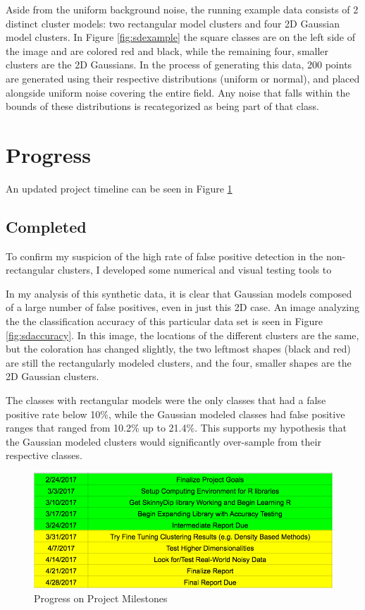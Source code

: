 \documentclass{sig-alternate-05-2015}
\begin{document}
Aside from the uniform background noise, the running example data consists of 2 distinct cluster models: two rectangular model clusters and four 2D Gaussian model clusters. In Figure \ref{fig:sdexample} the square classes are on the left side of the image and are colored red and black, while the remaining four, smaller clusters are the 2D Gaussians. In the process of generating this data, 200 points are generated using their respective distributions (uniform or normal), and placed alongside uniform noise covering the entire field. Any noise that falls within the bounds of these distributions is recategorized as being part of that class.

\section{Progress}
An updated project timeline can be seen in Figure \ref{fig:newmilestones}
\subsection{Completed}
To confirm my suspicion of the high rate of false positive detection in the non-rectangular clusters, I developed some numerical and visual testing tools to 

In my analysis of this synthetic data, it is clear that Gaussian models composed of a large number of false positives, even in just this 2D case. An image analyzing the the classification accuracy of this particular data set is seen in Figure \ref{fig:sdaccuracy}. In this image, the locations of the different clusters are the same, but the coloration has changed slightly, the two leftmost shapes (black and red) are still the rectangularly modeled clusters, and the four, smaller shapes are the 2D Gaussian clusters.

The classes with rectangular models were the only classes that had a false positive rate below 10\%, while the Gaussian modeled classes had false positive ranges that ranged from 10.2\% up to 21.4\%. This supports my hypothesis that the Gaussian modeled clusters would significantly over-sample from their respective classes.


\begin{figure}[t]
\centering
\includegraphics[width=\textwidth]{images/newtimeline}
\caption{Progress on Project Milestones}
\label{fig:newmilestones}
\end{figure}





\end{document}
